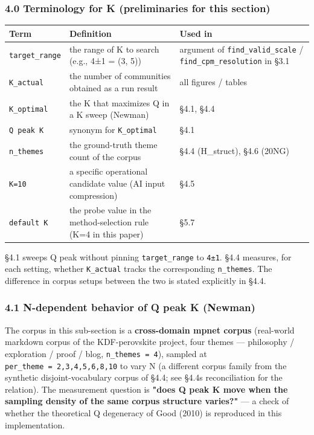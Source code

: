 \documentclass[
]{article}
\newcounter{none} %
\begin{document}
\subsubsection{4.0 Terminology for K (preliminaries for this
section)}\label{40-terminology-for-k-preliminaries-for-this-section}

{\def\LTcaptype{none} %
\begin{longtable}[]{@{}lll@{}}
\toprule\noalign{}
Term & Definition & Used in \\
\midrule\noalign{}
\endhead
\bottomrule\noalign{}
\endlastfoot
\texttt{target\_range} & the range of K to search (e.g., 4±1 = (3, 5)) &
argument of \texttt{find\_valid\_scale} / \texttt{find\_cpm\_resolution}
in §3.1 \\
\texttt{K\_actual} & the number of communities obtained as a run result
& all figures / tables \\
\texttt{K\_optimal} & the K that maximizes Q in a K sweep (Newman) &
§4.1, §4.4 \\
\texttt{Q\ peak\ K} & synonym for \texttt{K\_optimal} & §4.1 \\
\texttt{n\_themes} & the ground-truth theme count of the corpus & §4.4
(H\_struct), §4.6 (20NG) \\
\texttt{K=10} & a specific operational candidate value (AI input
compression) & §4.5 \\
\texttt{default\ K} & the probe value in the method-selection rule (K=4
in this paper) & §5.7 \\
\end{longtable}
}

§4.1 sweeps Q peak without pinning \texttt{target\_range} to
\texttt{4±1}. §4.4 measures, for each setting, whether
\texttt{K\_actual} tracks the corresponding \texttt{n\_themes}. The
difference in corpus setups between the two is stated explicitly in
§4.4.

\subsubsection{4.1 N-dependent behavior of Q peak K
(Newman)}\label{41-n-dependent-behavior-of-q-peak-k-newman}

The corpus in this sub-section is a \textbf{cross-domain mpnet corpus}
(real-world markdown corpus of the KDF-perovskite project, four themes
--- philosophy / exploration / proof / blog, \texttt{n\_themes\ =\ 4}),
sampled at \texttt{per\_theme\ =\ 2,3,4,5,6,8,10} to vary N (a different
corpus family from the synthetic disjoint-vocabulary corpus of §4.4; see
§4.4\textquotesingle s reconciliation for the relation). The measurement
question is \textbf{"does Q peak K move when the sampling density of the
same corpus structure varies?"} --- a check of whether the theoretical Q
degeneracy of Good (2010) is reproduced in this implementation.
\end{document}
